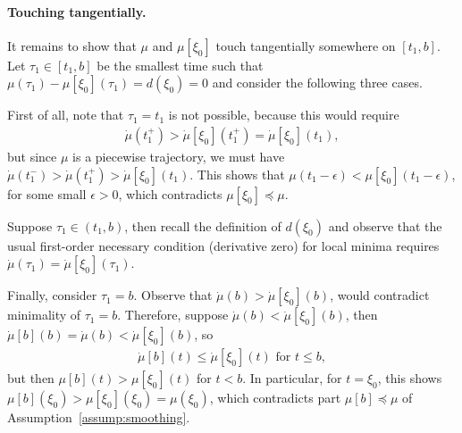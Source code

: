 \documentclass[a4paper]{report}
\theoremstyle{definition}
\theoremstyle{plain}
\begin{document}
\paragraph{Touching tangentially.}
%
It remains to show that $\mu$ and $\mu[\xi_{0}]$ touch tangentially somewhere on
$[t_{1}, b]$. Let $\tau_{1} \in [t_{1}, b]$ be the smallest time such that
$\mu(\tau_{1}) - \mu[\xi_{0}](\tau_{1}) = d(\xi_{0}) = 0$ and consider the
following three cases.

First of all, note that $\tau_{1} = t_{1}$ is not possible, because this
would require
\begin{align}
  \dot{\mu}(t_{1}^{+}) > \dot{\mu}[\xi_{0}](t_{1}^{+}) = \dot{\mu}[\xi_{0}](t_{1}) ,
\end{align}
but since $\mu$ is a piecewise trajectory, we must have
$\dot{\mu}(t_{1}^{-}) > \dot{\mu}(t_{1}^{+}) > \dot{\mu}[\xi_{0}](t_{1})$. This
shows that $\mu(t_{1} - \epsilon) < \mu[\xi_{0}](t_{1} - \epsilon)$, for
some small $\epsilon > 0$, which contradicts $\mu[\xi_{0}] \preceq \mu$.

Suppose $\tau_{1} \in (t_{1}, b)$, then recall the definition of $d(\xi_{0})$
and observe that the usual first-order necessary condition (derivative zero) for
local minima requires $\dot{\mu}(\tau_{1}) = \dot{\mu}[\xi_{0}](\tau_{1})$.

Finally, consider $\tau_{1} = b$.
%
Observe that $\dot{\mu}(b) > \dot{\mu}[\xi_{0}](b)$, would contradict
minimality of $\tau_{1} = b$. Therefore, suppose
$\dot{\mu}(b) < \dot{\mu}[\xi_{0}](b)$, then
$\dot{\mu}[b](b) = \dot{\mu}(b) < \dot{\mu}[\xi_{0}](b)$, so
\begin{align}
  \dot{\mu}[b](t) \leq \dot{\mu}[\xi_{0}](t) \text{ for } t \leq b ,
\end{align}
but then $\mu[b](t) > \mu[\xi_{0}](t)$ for $t < b$. In particular, for $t=\xi_{0}$, this shows
$\mu[b](\xi_{0}) > \mu[\xi_{0}](\xi_{0}) = \mu(\xi_{0})$, which contradicts part $\mu[b] \preceq \mu$ of
Assumption~\ref{assump:smoothing}.
\end{document}

